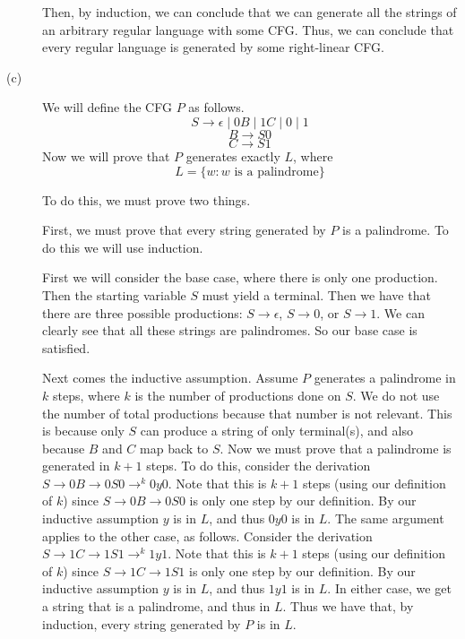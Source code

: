 \documentclass{article}
\begin{document}
\begin{description}
        Then, by induction, we can conclude that we can generate all the strings
        of an arbitrary regular language with some CFG.
        Thus, we can conclude that every regular language is generated by some
        right-linear CFG.
        \newpage
    \item[(c)] We will define the CFG $P$ as follows.
        \[ S \rightarrow \epsilon\;|\; 0B\; |\; 1C\; |\; 0\; |\; 1 \]
        \[ B \rightarrow S0 \]
        \[ C \rightarrow S1 \]
        Now we will prove that $P$ generates exactly $L$, where
        \[ L = \{w: w \text{ is a palindrome}\} \]

        To do this, we must prove two things.

        First, we must prove that every string generated by $P$ is a palindrome.
        To do this we will use induction.

        First we will consider the base case, where there is only
        one production.  Then the starting variable $S$ must yield a
        terminal. Then we have that there are three possible productions:
        $S \rightarrow \epsilon$, $S \rightarrow 0$, or $S \rightarrow 1$. We
        can clearly see that all these strings are palindromes. So our base
        case is satisfied.

        Next comes the inductive assumption. Assume $P$ generates a palindrome
        in $k$ steps, where $k$ is the number of productions
        done on $S$. We do not use the number of total productions because
        that number is not relevant. This is because only $S$ can produce
        a string of only terminal(s), and also because $B$ and $C$ map back
        to $S$. Now we must prove that a palindrome is generated in $k + 1$
        steps. To do this, consider the derivation
        $S \rightarrow 0B \rightarrow 0S0 \rightarrow^{k} 0y0$. Note
        that this is $k + 1$ steps (using our definition of $k$) since
        $S \rightarrow 0B \rightarrow 0S0$ is only one step by our definition.
        By our inductive assumption $y$ is in $L$, and thus $0y0$ is in $L$.
        The same argument
        applies to the other case, as follows. Consider the derivation
        $S \rightarrow 1C \rightarrow 1S1 \rightarrow^{k} 1y1$. Note
        that this is $k + 1$ steps (using our definition of $k$) since
        $S \rightarrow 1C \rightarrow 1S1$ is only one step by our definition.
        By our inductive assumption $y$ is in $L$, and thus $1y1$ is in $L$.
        In either case,
        we get a string that is a palindrome, and thus in $L$. Thus we have
        that, by induction, every string generated by $P$ is in $L$.


\end{description}
\end{document}
